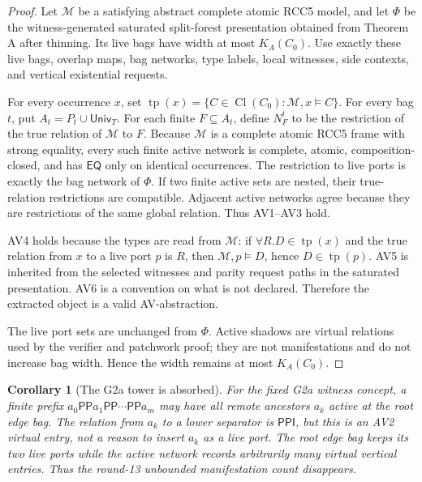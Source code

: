 \documentclass[11pt]{article}
\newtheorem{corollary}[theorem]{Corollary}
\newcommand{\EQ}{\mathsf{EQ}}
\newcommand{\PP}{\mathsf{PP}}
\newcommand{\PPI}{\mathsf{PPI}}
\newcommand{\Cl}{\operatorname{Cl}}
\newcommand{\tp}{\operatorname{tp}}
\newcommand{\Univ}{\mathsf{Univ}}
\begin{document}
\begin{proof}
Let \(\mathcal M\) be a satisfying abstract complete atomic RCC5 model, and let
\(\Phi\) be the witness-generated saturated split-forest presentation obtained
from Theorem A after thinning.  Its live bags have width at most \(K_A(C_0)\).
Use exactly these live bags, overlap maps, bag networks, type labels, local
witnesses, side contexts, and vertical existential requests.

For every occurrence \(x\), set \(\tp(x)=\{C\in\Cl(C_0):\mathcal M,x\models C\}\).
For every bag \(t\), put \(A_t=P_t\cup\Univ_T\).  For each finite
\(F\subseteq A_t\), define \(N^t_F\) to be the restriction of the true relation
of \(\mathcal M\) to \(F\).  Because \(\mathcal M\) is a complete atomic RCC5
frame with strong equality, every such finite active network is complete,
atomic, composition-closed, and has \(\EQ\) only on identical occurrences.
The restriction to live ports is exactly the bag network of \(\Phi\).  If two
finite active sets are nested, their true-relation restrictions are compatible.
Adjacent active networks agree because they are restrictions of the same global
relation.  Thus AV1--AV3 hold.

AV4 holds because the types are read from \(\mathcal M\): if
\(\forall R.D\in\tp(x)\) and the true relation from \(x\) to a live port
\(p\) is \(R\), then \(\mathcal M,p\models D\), hence \(D\in\tp(p)\).
AV5 is inherited from the selected witnesses and parity request paths in the
saturated presentation.  AV6 is a convention on what is not declared.
Therefore the extracted object is a valid AV-abstraction.

The live port sets are unchanged from \(\Phi\).  Active shadows are virtual
relations used by the verifier and patchwork proof; they are not manifestations
and do not increase bag width.  Hence the width remains at most \(K_A(C_0)\).
\end{proof}

\begin{corollary}[The G2a tower is absorbed]
For the fixed G2a witness concept, a finite prefix
\(a_0\PP a_1\PP\cdots\PP a_m\) may have all remote ancestors
\(a_k\) active at the root edge bag.  The relation from \(a_k\) to a lower
separator is \(\PPI\), but this is an AV2 virtual entry, not a reason to insert
\(a_k\) as a live port.  The root edge bag keeps its two live ports while the
active network records arbitrarily many virtual vertical entries.  Thus the
round-13 unbounded manifestation count disappears.
\end{corollary}
\end{document}
